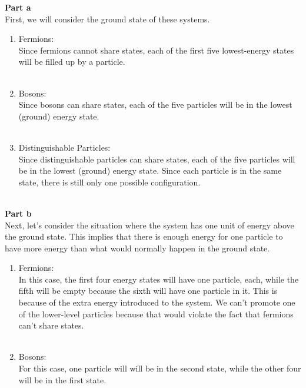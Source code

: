 \documentclass[12pt]{article}
\begin{document}
\begin{flushleft}
\textbf{Part a}\\
First, we will consider the ground state of these systems.
\begin{enumerate}

    \item Fermions:\\
    Since fermions cannot share states, each of the first five lowest-energy states will be filled up by a particle.\\~\\

    \item Bosons:\\
    Since bosons can share states, each of the five particles will be in the lowest (ground) energy state.\\~\\

    \item Distinguishable Particles:\\
    Since distinguishable particles can share states, each of the five particles will be in the lowest (ground) energy state.
    Since each particle is in the same state, there is still only one possible configuration.\\~\\

\end{enumerate}


\textbf{Part b}\\
Next, let's consider the situation where the system has one unit of energy above the ground state.
This implies that there is enough energy for one particle to have more energy than what would normally happen in the ground state.
\begin{enumerate}

    \item Fermions:\\
    In this case, the first four energy states will have one particle, each, while the fifth will be empty because the sixth will have one particle in it. This is because of the extra energy introduced to the system. We can't promote one of the lower-level particles because that would violate the fact that fermions can't share states.\\~\\

    \item Bosons:\\
    For this case, one particle will will be in the second state, while the other four will be in the first state.\\~\\


\end{enumerate}
\end{flushleft}
\end{document}
